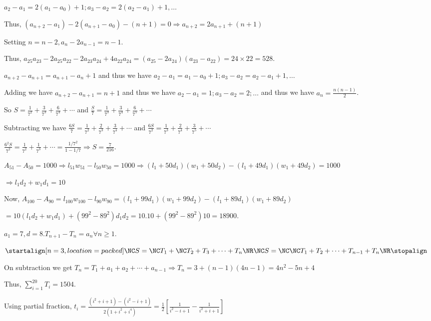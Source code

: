   $a_2 - a_1 = 2(a_1 - a_0) + 1; a_3 - a_2 = 2(a_2 - a_1) + 1, \ldots$

  Thus, $(a_{n + 2} - a_1) - 2(a_{n + 1} - a_0) - (n + 1) = 0\Rightarrow a_{n + 2} = 2a_{n + 1} + (n + 1)$

  Setting $n = n - 2, a_n - 2a_{n - 1} = n - 1$.

  Thus, $a_{25}a_{23} - 2a_{25}a_{22} - 2a_{23}a_{24} + 4a_{22}a_{24} = (a_{25} - 2a_{24})(a_{23} - a_{22})
  = 24\times 22 = 528$.
\item $a_{n + 2} - a_{n + 1} = a_{n + 1} - a_n + 1$ and thus we have $a_2 - a_1 = a_1 - a_0 + 1; a_3 - a_2 =
  a_2 - a_1 + 1, \ldots$

  Adding we have $a_{n + 2} - a_{n + 1} = n + 1$ and thus we have $a_2 - a_1 = 1; a_3 - a_2 = 2; \ldots$ and
  thus we have $a_n = \frac{n(n - 1)}{2}$.

  So $S = \frac{1}{7^2} + \frac{3}{7^3} + \frac{6}{7^4} + \cdots$ and $\frac{S}{7} = \frac{1}{7^3}
  + \frac{3}{7^4} + \frac{6}{7^5} + \cdots$

  Subtracting we have $\frac{6S}{7} = \frac{1}{7^2} + \frac{2}{7^3} + \frac{3}{7^4} + \cdots$ and
  $\frac{6S}{7^2} = \frac{1}{7^3} + \frac{2}{7^4} + \frac{3}{7^5} + \cdots$

  $\frac{6^2S}{7^2} = \frac{1}{7^2} + \frac{1}{7^3} + \cdots =\frac{1/7^2}{1 - 1/7} \Rightarrow S
  = \frac{7}{216}$.
\item $A_{51} - A_{50} = 1000\Rightarrow l_{51}w_{51} - l_{50}w_{50} = 1000 \Rightarrow (l_1 + 50d_1)(w_1 +
  50d_2) - (l_1 + 49d_1)(w_1 + 49d_2) = 1000$

  $\Rightarrow l_1d_2 + w_1d_1 = 10$

  Now, $A_{100} - A_{90} = l_{100}w_{100} - l_{90}w_{90} = (l_1 + 99d_1)(w_1 + 99d_2) - (l_1 + 89d_1)(w_1 +
  89d_2)$

  $= 10(l_1d_2 + w_1d_1) + (99^2 - 89^2)d_1d_2 = 10.10 + (99^2 - 89^2)10 = 18900$.
\item $a_1 = 7, d = 8. T_{n + 1} - T_n = a_n\forall n\geq 1$.

  $\startalign[n=3, location=packed]
    \NC S = \NC T_1 + \NC T_2 + T_3 + \cdots + T_n\NR
    \NC S = \NC \NC T_1 + T_2 + \cdots + T_{n - 1} + T_n\NR
  \stopalign$

  On subtraction we get $T_n = T_1 + a_1 + a_2 + \cdots + a_{n - 1}\Rightarrow T_n = 3 + (n - 1)(4n - 1) =
  4n^2 - 5n + 4$

  Thus, $\displaystyle\sum_{i = 1}^{20}T_i = 1504$.
\item Using partial fraction, $t_i = \frac{(i^2 + i + 1) - (i^2 - i + 1)}{2(1 + i^2 + i^4)}
  = \frac{1}{2}\left[\frac{1}{i^2 - i + 1} - \frac{1}{i^2 + i + 1}\right]$

